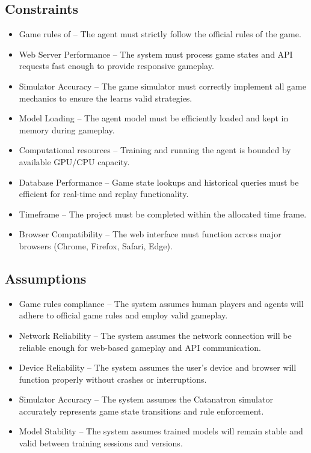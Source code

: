 \documentclass{article}
\begin{document}
\subsection{Constraints}\label{subsec:constraints}
\begin{itemize}
    \item {Game rules of \emph{\Catan{}}} – The \RL{} agent must strictly follow the official rules of the game.
    \item {Web Server Performance} – The system must process game states and API requests fast enough to provide responsive gameplay.
    \item {Simulator Accuracy} – The game simulator must correctly implement all game mechanics to ensure the \AI{} learns valid strategies.
    \item {Model Loading} – The \RL{} agent model must be efficiently loaded and kept in memory during gameplay.
    \item {Computational resources} – Training and running the \RL{} agent is bounded by available GPU/CPU capacity.
    \item {Database Performance} – Game state lookups and historical queries must be efficient for real-time and replay functionality.
    \item {Timeframe} – The project must be completed within the allocated time frame.
    \item {Browser Compatibility} – The web interface must function across major browsers (Chrome, Firefox, Safari, Edge).
\end{itemize}

\subsection{Assumptions}\label{subsec:assumptions}
\begin{itemize}
    \item {Game rules compliance} – The system assumes human players and \AI{} agents will adhere to official game rules and employ valid gameplay.
    \item {Network Reliability} – The system assumes the network connection will be reliable enough for web-based gameplay and API communication.
    \item {Device Reliability} – The system assumes the user's device and browser will function properly without crashes or interruptions.
    \item {Simulator Accuracy} – The system assumes the Catanatron simulator accurately represents game state transitions and rule enforcement.
    \item {Model Stability} – The system assumes trained \RL{} models will remain stable and valid between training sessions and versions.
\end{itemize}
\end{document}

